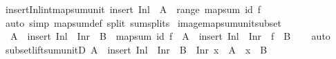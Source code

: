 \begin{isabellebody}
\endisatagproof
{\isafoldproof}%
%
\isadelimproof
\isanewline
%
\endisadelimproof
\isanewline
{}\isamarkupfalse%
\ insert{\isacharunderscore}{\kern0pt}Inl{\isacharunderscore}{\kern0pt}int{\isacharunderscore}{\kern0pt}map{\isacharunderscore}{\kern0pt}sum{\isacharunderscore}{\kern0pt}unit{\isacharcolon}{\kern0pt}\ {\isachardoublequoteopen}insert\ {\isacharparenleft}{\kern0pt}Inl\ {\isacharparenleft}{\kern0pt}{\isacharparenright}{\kern0pt}{\isacharparenright}{\kern0pt}\ A\ {\isasyminter}\ range\ {\isacharparenleft}{\kern0pt}map{\isacharunderscore}{\kern0pt}sum\ id\ f{\isacharparenright}{\kern0pt}\ {\isasymnoteq}\ {\isacharbraceleft}{\kern0pt}{\isacharbraceright}{\kern0pt}{\isachardoublequoteclose}\isanewline
%
\isadelimproof
\ \ %
\endisadelimproof
%
\isatagproof
{}\isamarkupfalse%
\ {\isacharparenleft}{\kern0pt}auto\ simp{\isacharcolon}{\kern0pt}\ map{\isacharunderscore}{\kern0pt}sum{\isacharunderscore}{\kern0pt}def\ split{\isacharcolon}{\kern0pt}\ sum{\isachardot}{\kern0pt}splits{\isacharparenright}{\kern0pt}%
\endisatagproof
{\isafoldproof}%
%
\isadelimproof
\isanewline
%
\endisadelimproof
\isanewline
{}\isamarkupfalse%
\ image{\isacharunderscore}{\kern0pt}map{\isacharunderscore}{\kern0pt}sum{\isacharunderscore}{\kern0pt}unit{\isacharunderscore}{\kern0pt}subset{\isacharcolon}{\kern0pt}\isanewline
\ \ {\isachardoublequoteopen}A\ {\isasymsubseteq}\ insert\ {\isacharparenleft}{\kern0pt}Inl\ {\isacharparenleft}{\kern0pt}{\isacharparenright}{\kern0pt}{\isacharparenright}{\kern0pt}\ {\isacharparenleft}{\kern0pt}Inr\ {\isacharbackquote}{\kern0pt}\ B{\isacharparenright}{\kern0pt}\ {\isasymLongrightarrow}\ map{\isacharunderscore}{\kern0pt}sum\ id\ f\ {\isacharbackquote}{\kern0pt}\ A\ {\isasymsubseteq}\ insert\ {\isacharparenleft}{\kern0pt}Inl\ {\isacharparenleft}{\kern0pt}{\isacharparenright}{\kern0pt}{\isacharparenright}{\kern0pt}\ {\isacharparenleft}{\kern0pt}Inr\ {\isacharbackquote}{\kern0pt}\ f\ {\isacharbackquote}{\kern0pt}\ B{\isacharparenright}{\kern0pt}{\isachardoublequoteclose}\isanewline
%
\isadelimproof
\ \ %
\endisadelimproof
%
\isatagproof
{}\isamarkupfalse%
\ auto%
\endisatagproof
{\isafoldproof}%
%
\isadelimproof
\isanewline
%
\endisadelimproof
\isanewline
{}\isamarkupfalse%
\ subset{\isacharunderscore}{\kern0pt}lift{\isacharunderscore}{\kern0pt}sum{\isacharunderscore}{\kern0pt}unitD{\isacharcolon}{\kern0pt}\ {\isachardoublequoteopen}A\ {\isasymsubseteq}\ insert\ {\isacharparenleft}{\kern0pt}Inl\ {\isacharparenleft}{\kern0pt}{\isacharparenright}{\kern0pt}{\isacharparenright}{\kern0pt}\ {\isacharparenleft}{\kern0pt}Inr\ {\isacharbackquote}{\kern0pt}\ B{\isacharparenright}{\kern0pt}\ {\isasymLongrightarrow}\ Inr\ x\ {\isasymin}\ A\ {\isasymLongrightarrow}\ x\ {\isasymin}\ B{\isachardoublequoteclose}\isanewline

\end{isabellebody}
